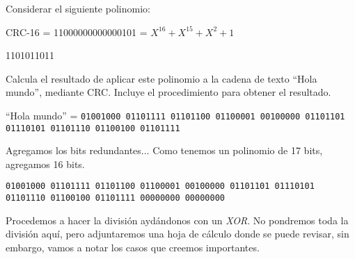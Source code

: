 \documentclass[spanish,12pt,letterpaper]{article}
\begin{document}
Considerar el siguiente polinomio:

CRC-16 = 11000000000000101 = $X^{16} + X^{15} + X^{2}+ 1$

1101011011

Calcula el resultado de aplicar este polinomio a la cadena de texto ``Hola
mundo'', mediante CRC. Incluye el procedimiento para obtener el resultado.

``Hola mundo'' = \texttt{01001000 01101111 01101100 01100001 00100000 01101101
  01110101 01101110 01100100 01101111}

Agregamos los bits redundantes... Como tenemos un polinomio de 17 bits, agregamos
16 bits.

\texttt{01001000 01101111 01101100 01100001 00100000 01101101 01110101 01101110
  01100100 01101111 00000000 00000000}

Procedemos a hacer la división aydándonos con un \textit{XOR}. No pondremos toda
la división aquí, pero adjuntaremos una hoja de cálculo donde se puede revisar,
sin embargo, vamos a notar los casos que creemos importantes.
\end{document}
